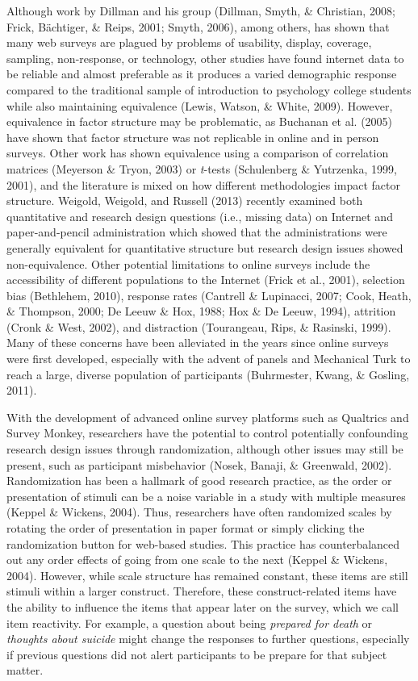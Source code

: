 \documentclass[english,man, mask]{apa6}
\theoremstyle{definition}
\theoremstyle{definition}
\theoremstyle{definition}
\theoremstyle{remark}
\begin{document}
Although work by Dillman and his group (Dillman, Smyth, \& Christian,
2008; Frick, Bächtiger, \& Reips, 2001; Smyth, 2006), among others, has
shown that many web surveys are plagued by problems of usability,
display, coverage, sampling, non-response, or technology, other studies
have found internet data to be reliable and almost preferable as it
produces a varied demographic response compared to the traditional
sample of introduction to psychology college students while also
maintaining equivalence (Lewis, Watson, \& White, 2009). However,
equivalence in factor structure may be problematic, as Buchanan et al.
(2005) have shown that factor structure was not replicable in online and
in person surveys. Other work has shown equivalence using a comparison
of correlation matrices (Meyerson \& Tryon, 2003) or \emph{t}-tests
(Schulenberg \& Yutrzenka, 1999, 2001), and the literature is mixed on
how different methodologies impact factor structure. Weigold, Weigold,
and Russell (2013) recently examined both quantitative and research
design questions (i.e., missing data) on Internet and paper-and-pencil
administration which showed that the administrations were generally
equivalent for quantitative structure but research design issues showed
non-equivalence. Other potential limitations to online surveys include
the accessibility of different populations to the Internet (Frick et
al., 2001), selection bias (Bethlehem, 2010), response rates (Cantrell
\& Lupinacci, 2007; Cook, Heath, \& Thompson, 2000; De Leeuw \& Hox,
1988; Hox \& De Leeuw, 1994), attrition (Cronk \& West, 2002), and
distraction (Tourangeau, Rips, \& Rasinski, 1999). Many of these
concerns have been alleviated in the years since online surveys were
first developed, especially with the advent of panels and Mechanical
Turk to reach a large, diverse population of participants (Buhrmester,
Kwang, \& Gosling, 2011).

With the development of advanced online survey platforms such as
Qualtrics and Survey Monkey, researchers have the potential to control
potentially confounding research design issues through randomization,
although other issues may still be present, such as participant
misbehavior (Nosek, Banaji, \& Greenwald, 2002). Randomization has been
a hallmark of good research practice, as the order or presentation of
stimuli can be a noise variable in a study with multiple measures
(Keppel \& Wickens, 2004). Thus, researchers have often randomized
scales by rotating the order of presentation in paper format or simply
clicking the randomization button for web-based studies. This practice
has counterbalanced out any order effects of going from one scale to the
next (Keppel \& Wickens, 2004). However, while scale structure has
remained constant, these items are still stimuli within a larger
construct. Therefore, these construct-related items have the ability to
influence the items that appear later on the survey, which we call item
reactivity. For example, a question about being \emph{prepared for
death} or \emph{thoughts about suicide} might change the responses to
further questions, especially if previous questions did not alert
participants to be prepare for that subject matter.
\end{document}

